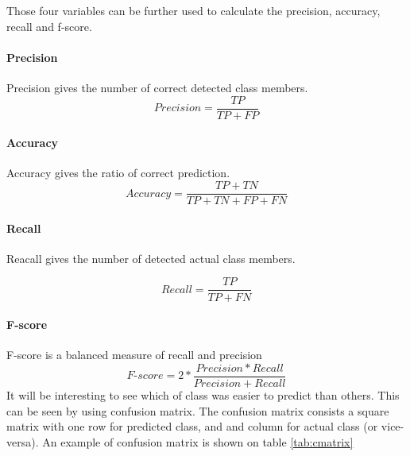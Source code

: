 \documentclass[USenglish]{ifimaster}  %
\begin{document}
Those four variables can be further used to calculate the precision, accuracy, recall and f-score.

\paragraph{Precision}
Precision gives the number of correct detected class members.
\begin{equation}
    Precision = \frac{TP}{TP + FP}
    \label{eq:prec}
\end{equation}

\paragraph{Accuracy}
Accuracy gives the ratio of correct prediction. 
\begin{equation}
    Accuracy = \frac{TP + TN}{TP + TN + FP + FN}
    \label{eq:acc}
\end{equation}

\paragraph{Recall}
Reacall gives the number of detected actual class members.

\begin{equation}
    Recall = \frac{TP}{TP + FN}
    \label{eq:recall}
\end{equation}

\paragraph{F-score}
F-score is a balanced measure of recall and precision 
\begin{equation}
    \textit{F-score} = 2*\frac{Precision*Recall}{Precision + Recall}
    \label{eq:fscore}
\end{equation}
\FloatBarrier
It will be interesting to see which of class was easier to predict than others. This can be seen by using confusion matrix. The confusion matrix consists a square matrix with one row for predicted class, and and column for actual class (or vice-versa).
An example of confusion matrix is shown on table \ref{tab:cmatrix}
\end{document}
